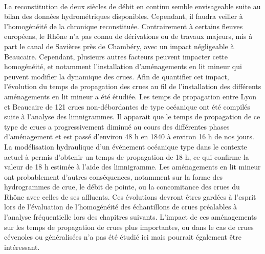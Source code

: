 \documentclass[11pt]{article}
\begin{document}
	\paragraph{} La reconstitution de deux siècles de débit en continu semble envisageable suite au bilan des données hydrométriques disponibles. Cependant, il faudra veiller à l'homogénéité de la chronique reconstituée. Contrairement à certains fleuves européens, le Rhône n'a pas connu de dérivations ou de travaux majeurs, mis à part le canal de Savières près de Chambéry, avec un impact négligeable à Beaucaire. Cependant, plusieurs autres facteurs peuvent impacter cette homogénéité, et notamment l'installation d'aménagements en lit mineur qui peuvent modifier la dynamique des crues. Afin de quantifier cet impact, l'évolution du temps de propagation des crues au fil de l'installation des différents aménagements en lit mineur a été étudiée. Les temps de propagation entre Lyon et Beaucaire de 121 crues non-débordantes de type océanique ont été compilés suite à l'analyse des limnigrammes. Il apparait que le temps de propagation de ce type de crues a progressivement diminué au cours des différentes phases d'aménagement et est passé d'environ 48 h en 1840 à environ 16 h de nos jours. La modélisation hydraulique d'un événement océanique type dans le contexte actuel à permis d'obtenir un temps de propagation de 18 h, ce qui confirme la valeur de 18 h estimée à l'aide des limnigramme. Les aménagements en lit mineur ont probablement d'autres conséquences, notamment sur la forme des hydrogrammes de crue, le débit de pointe, ou la concomitance des crues du Rhône avec celles de ses affluents. Ces évolutions devront êtres gardées à l'esprit lors de l'évaluation de l'homogénéité des échantillons de crues préalables à l'analyse fréquentielle lors des chapitres suivants. L'impact de ces aménagements sur les temps de propagation de crues plus importantes, ou dans le cas de crues cévenoles ou généralisées n'a pas été étudié ici mais pourrait également être intéressant.
	
\end{document}
